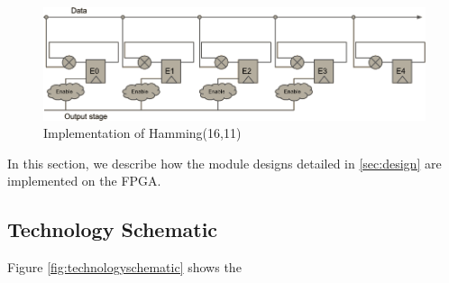 
\begin{figure}
\includegraphics[width=15cm]{implementation/fig_ecc}
\caption{Implementation of Hamming(16,11)}
\label{fig:ecc}
\end{figure}

In this section, we describe how the module designs detailed in
\autoref{sec:design} are implemented on the FPGA. 

\subsection{Technology Schematic}
\label{sec:technologyschematic}

Figure \autoref{fig:technologyschematic} shows the 

